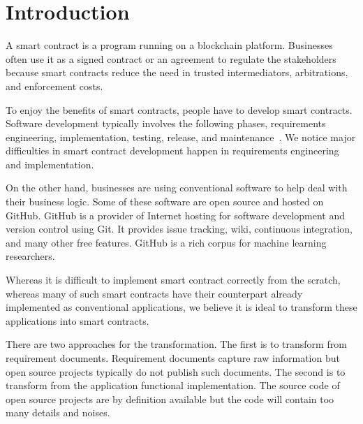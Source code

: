 \chapter{Introduction}



A smart contract is a program running on a blockchain platform.
Businesses often use it as a signed contract or an agreement to regulate the stakeholders~\cite{savelyev2017contract}
because smart contracts reduce the need in trusted intermediators, arbitrations, and enforcement costs.

To enjoy the benefits of smart contracts, people have to develop smart contracts.
Software development typically involves the following phases, requirements engineering, implementation, testing, release, and maintenance~\cite{petersen2009waterfall}. We notice major difficulties in smart contract development happen in requirements engineering and implementation.



On the other hand, businesses are using conventional software to help deal with their business logic.
Some of these software are open source and hosted on GitHub.
GitHub is a provider of Internet hosting for software development and version control using Git. It provides issue tracking, wiki, continuous integration, and many other free features.
GitHub is a rich corpus for machine learning researchers.

Whereas it is difficult to implement smart contract correctly from the scratch,
whereas many of such smart contracts have their counterpart already implemented as conventional applications,
we believe it is ideal to transform these applications into smart contracts.

There are two approaches for the transformation. The first is to transform from requirement documents.
Requirement documents capture raw information but open source projects typically do not publish such documents.
The second is to transform from the application functional implementation.
The source code of open source projects are by definition available but the code will contain too many details and noises.

